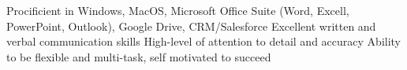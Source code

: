
\begin{cvskills}
\cvskill
{}
{Procificient in Windows, MacOS, Microsoft Office Suite (Word, Excell, PowerPoint, Outlook), Google Drive, CRM/Salesforce}
\cvskill
{}
{Excellent written and verbal communication skills}
\cvskill
{}
{High-level of attention to detail and accuracy}
\cvskill
{}
{Ability to be flexible and multi-task, self motivated to succeed}

\end{cvskills}
